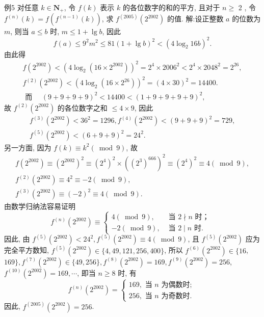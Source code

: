 例5 对任意 $k \in \mathbf{N}_{+}$, 令 $f(k)$ 表示 $k$ 的各位数字的和的平方, 且对于 $n \geqslant$ 2 , 令 $f^{(n)}(k)=f\left(f^{(n-1)}(k)\right)$, 求 $f^{(2005)}\left(2^{2002}\right)$ 的值.
解:设正整数 $a$ 的位数为 $m$, 则当 $a \leqslant b$ 时, $m \leqslant 1+\lg b$, 因此
$$
f(a) \leqslant 9^2 m^2 \leqslant 81(1+\lg b)^2<\left(4 \log _2 16 b\right)^2 .
$$
由此得
$$
\begin{gathered}
f\left(2^{2002}\right)<\left(4 \log _2\left(16 \times 2^{2002}\right)\right)^2=2^4 \times 2006^2<2^4 \times 2048^2=2^{26}, \\
f^{(2)}\left(2^{2002}\right)<\left(4 \log _2\left(16 \times 2^{26}\right)\right)^2=(4 \times 30)^2=14400 . \\
\text { 而 } \quad(9+9+9+9)^2<14400<(1+9+9+9+9)^2,
\end{gathered}
$$
故 $f^{(2)}\left(2^{2002}\right)$ 的各位数字之和 $\leqslant 4 \times 9$, 因此
$$
\begin{gathered}
f^{(3)}\left(2^{2002}\right)<36^2=1296, f^{(4)}\left(2^{2002}\right)<(9+9+9)^2=729, \\
f^{(5)}\left(2^{2002}\right)<(6+9+9)^2=24^2 .
\end{gathered}
$$
另一方面, 因为 $f(k) \equiv k^2(\bmod 9)$, 故
$$
\begin{gathered}
f\left(2^{2002}\right) \equiv\left(2^{2002}\right)^2 \equiv\left(2^4\right)^2 \times\left(\left(2^3\right)^{666}\right)^2 \equiv\left(2^4\right)^2 \equiv 4(\bmod 9), \\
f^{(2)}\left(2^{2002}\right) \equiv 4^2 \equiv-2(\bmod 9), \\
f^{(3)}\left(2^{2002}\right) \equiv(-2)^2 \equiv 4(\bmod 9) .
\end{gathered}
$$
由数学归纳法容易证明
$$
f^{(n)}\left(2^{2002}\right) \equiv \begin{cases}4(\bmod 9), & \text { 当 } 2 \nmid n \text { 时； } \\ -2(\bmod 9), & \text { 当 } 2 \mid n \text { 时.
}\end{cases}
$$
因此, 由 $f^{(5)}\left(2^{2002}\right)<24^2, f^{(5)}\left(2^{2002}\right) \equiv 4(\bmod 9)$, 且 $f^{(5)}\left(2^{2002}\right)$ 应为完全平方数知, $f^{(5)}\left(2^{2002}\right) \in\{4,49,121,256,400\}$, 所以 $f^{(6)}\left(2^{2002}\right) \in\{16$, $169\}, f^{(7)}\left(2^{2002}\right) \in\{49,256\}, f^{(8)}\left(2^{2002}\right)=169, f^{(9)}\left(2^{2002}\right)=256$, $f^{(10)}\left(2^{2002}\right)=169, \cdots$, 即当 $n \geqslant 8$ 时, 有
$$
f^{(n)}\left(2^{2002}\right)=\left\{\begin{array}{l}
169, \text { 当 } n \text { 为偶数时; } \\
256, \text { 当 } n \text { 为奇数时.
}
\end{array}\right.
$$
因此, $f^{(2005)}\left(2^{2002}\right)=256$.



